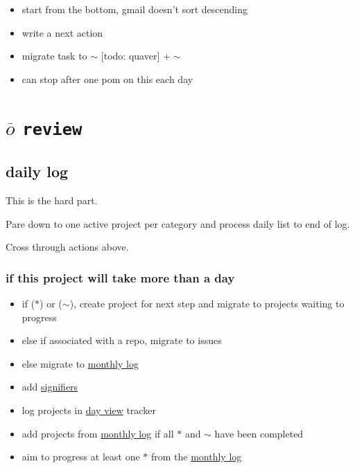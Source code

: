\documentclass[]{book}
\providecommand{\tightlist}{%
  \setlength{\itemsep}{0pt}\setlength{\parskip}{0pt}}
\begin{document}
\begin{itemize}
\tightlist
\item
  start from the bottom, gmail doesn't sort descending
\item
  write a next action
\item
  migrate task to \(\sim\) {[}todo: quaver{]} \(+ \sim\)
\item
  can stop after one pom on this each day
\end{itemize}

\hypertarget{review}{%
\section{\texorpdfstring{\textbf{\(\overline o\) \texttt{review}}}{\textbackslash{}overline o review}}\label{review}}

\hypertarget{daily-log}{%
\subsection{daily log}\label{daily-log}}

This is the hard part.

Pare down to one active project per category and process daily list to end of log.

Cross through actions above.

\hypertarget{if-this-project-will-take-more-than-a-day}{%
\subsubsection{if this project will take more than a day}\label{if-this-project-will-take-more-than-a-day}}

\begin{itemize}
\item
  if (\(*\)) or (\(\sim\)), create project for next step and migrate to projects waiting to progress
\item
  else if associated with a repo, migrate to issues
\item
  else migrate to \protect\hyperlink{monthly-log}{monthly log}
\item
  add \protect\hyperlink{signifiers}{signifiers}
\item
  log projects in \protect\hyperlink{day-view}{day view} tracker
\item
  add projects from \protect\hyperlink{monthly-log}{monthly log} if all \(*\) and \(\sim\) have been completed
\item
  aim to progress at least one \(*\) from the \protect\hyperlink{monthly-log}{monthly log}
\end{itemize}
\end{document}
